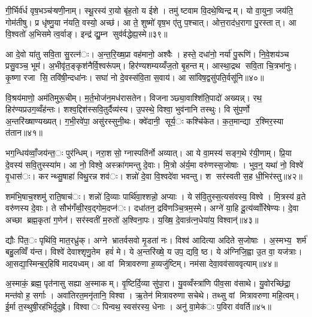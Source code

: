 गी॒र्भिर्व॑र्ध वृष॒भञ्च॑ऱ्षणी॒नाम्। स्थू॒रस्य॑ रा॒यो बृ॑ह॒तो य ईशे। तमु॑ ष्टवाम वि॒दथे॒ष्विन्द्रम्। यो वा॒युना॒ जय॑ति॒ गोम॑तीषु। प्र धृ॑ष्णु॒या न॑यति॒ वस्यो॒ अच्छ॑। आ ते॒ शुष्मो॑ वृष॒भ ए॑तु प॒श्चात्। ओत्त॒राद॑ध॒रागा पु॒रस्तात्। आ वि॒श्वतो॑ अ॒भिसमेत्व॒र्वाङ्। इन्द्र॑ द्यु॒म्न सुव॑र्वद्धेह्य॒स्मे॥३९॥


आ दे॒वो या॑तु सवि॒ता सु॒रत्न॑ः। अ॒न्त॒रि॒ख्ष॒प्रा वह॑मानो॒ अश्वैः। हस्ते॒ दधा॑नो॒ नर्या॑ पु॒रूणि॑। नि॒वे॒शय॑ञ्च प्रसु॒वञ्च॒ भूम॑। अ॒भीवृ॑त॒ङ्कृश॑नैर्वि॒श्वरू॑पम्। हिर॑ण्यशम्यय्यँज॒तो बृ॒हन्तम्। आस्था॒द्रथ सवि॒ता चि॒त्रभा॑नुः। कृ॒ष्णा रजा सि॒ तवि॑षी॒न्दधा॑नः। सघा॑ नो दे॒वस्स॑वि॒ता स॒वाय॑। आ सा॑विष॒द्वसु॑पति॒र्वसू॑नि॥४०॥

वि॒श्रय॑माणो॒ अम॑तिमुरू॒चीम्। म॒र्त॒भोज॑न॒मध॑रासतेन। विजनाञ्छ्या॒वाश्शि॑ति॒पादो॑ अख्यन्न्। रथ॒ हिर॑ण्यप्रउग॒व्वँह॑न्तः। शश्व॒द्दिश॑स्सवि॒तुर्दैव्य॑स्य। उ॒पस्थे॒ विश्वा॒ भुव॑नानि तस्थुः। वि सु॑प॒र्णो अ॒न्तरि॑ख्षाण्यख्यत्। ग॒भी॒रवे॑पा॒ असु॑रस्सुनी॒थः। क्वे॑दानी॒ सूर्य॒ः कश्चि॑केत। क॒त॒मान्द्या र॒श्मिर॒स्या त॑तान॥४१॥

भग॒न्धिय॑व्वाँ॒जय॑न्त॒ः पुर॑न्धिम्। नरा॒शसो॒ ग्नास्पति॑र्नो अव्यात्। आ ये वा॒मस्य॑ सङ्ग॒थे र॑यी॒णाम्। प्रि॒या दे॒वस्य॑ सवि॒तुस्स्या॑म। आ नो॒ विश्वे॒ अस्क्रा॑गमन्तु दे॒वाः। मि॒त्रो अ॑र्य॒मा वरु॑णस्स॒जोषाः। भुव॒न्॒ यथा॑ नो॒ विश्वे॑ वृ॒धास॑ः। करन्थ्सु॒षाहा॑ विथु॒रन्न शव॑ः। शन्नो॑ दे॒वा वि॒श्वदे॑वा भवन्तु। श सर॑स्वती स॒ह धी॒भिर॑स्तु॥४२॥

शम॑भि॒षाच॒श्शमु॑ राति॒षाच॑ः। शन्नो॑ दि॒व्याः पार्थि॑वा॒श्शन्नो॒ अप्याः। ये स॑वि॒तुस्स॒त्यस॑वस्य॒ विश्वे। मि॒त्रस्य॑ व्र॒ते वरु॑णस्य दे॒वाः। ते सौभ॑गँव्वी॒रव॒द्गोम॒दप्न॑ः। दधा॑तन॒ द्रवि॑णञ्चि॒त्रम॒स्मे। अग्ने॑ या॒हि दू॒त्य॑व्वाँरि॑षेण्यः। दे॒वा अच्छा ब्रह्म॒कृता॑ ग॒णेन॑। सर॑स्वतीं म॒रुतो॑ अ॒श्विना॒पः। य॒ख्षि॒ दे॒वान्र॑त्न॒धेया॑य॒ विश्वान्॑॥४३॥

द्यौः पि॑त॒ः पृथि॑वि॒ मात॒रध्रु॑क्। अग्ने भ्रातर्वसवो मृ॒डता॑ नः। विश्व॑ आदित्या अदिते स॒जोषाः। अ॒स्मभ्य॒ शर्म॑ बहु॒लव्विँ य॑न्त। विश्वे॑ देवाश्शृणु॒तेम हवं॑ मे। ये अ॒न्तरि॑ख्षे॒ य उप॒ द्यवि॒ ष्ठ। ये अ॑ग्निजि॒ह्वा उ॒त वा॒ यज॑त्राः। आ॒सद्या॒स्मिन्ब॒र्॒हिषि॑ मादयध्वम्। आ वां मित्रावरुणा ह॒व्यजु॑ष्टिम्। नम॑सा देवा॒वव॑साववृत्याम्॥४४॥

अ॒स्माकं॒ ब्रह्म॒ पृत॑नासु सह्या अ॒स्माकम्। वृ॒ष्टिर्दि॒व्या सु॑पा॒रा। यु॒वव्वँस्त्रा॑णि पीव॒सा व॑साथे। यु॒वोरच्छि॑द्रा॒ मन्त॑वो ह॒ सर्गाः। अवा॑तिरत॒मनृ॑तानि॒ विश्वा। ऋ॒तेन॑ मित्रावरुणा सचेथे। तथ्सु वां मित्रावरुणा महि॒त्वम्। ई॒र्मा त॒स्थुषी॒रह॑भिर्दुदुह्रे। विश्वाः पिन्वथ॒ स्वस॑रस्य॒ धेनाः। अनु॑ वा॒मेक॑ः प॒विरा व॑वर्ति॥४५॥

